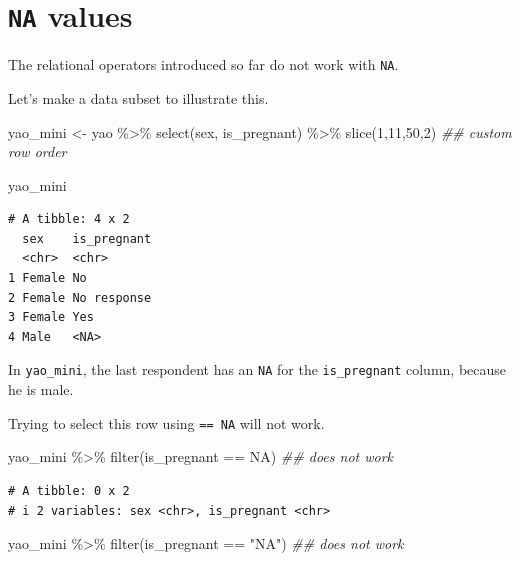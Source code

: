 \documentclass[
  letterpaper,
  DIV=11,
  numbers=noendperiod]{scrreprt}
\newenvironment{Shaded}{\begin{snugshade}}{\end{snugshade}}
\newcommand{\ConstantTok}[1]{\textcolor[rgb]{0.56,0.35,0.01}{#1}}
\newcommand{\DecValTok}[1]{\textcolor[rgb]{0.68,0.00,0.00}{#1}}
\newcommand{\DocumentationTok}[1]{\textcolor[rgb]{0.37,0.37,0.37}{\textit{#1}}}
\newcommand{\FunctionTok}[1]{\textcolor[rgb]{0.28,0.35,0.67}{#1}}
\newcommand{\NormalTok}[1]{\textcolor[rgb]{0.00,0.23,0.31}{#1}}
\newcommand{\OtherTok}[1]{\textcolor[rgb]{0.00,0.23,0.31}{#1}}
\newcommand{\SpecialCharTok}[1]{\textcolor[rgb]{0.37,0.37,0.37}{#1}}
\newcommand{\StringTok}[1]{\textcolor[rgb]{0.13,0.47,0.30}{#1}}
\begin{document}
\hypertarget{na-values}{%
\section{\texorpdfstring{\texttt{NA}
values}{NA values}}\label{na-values}}

The relational operators introduced so far do not work with \texttt{NA}.

Let's make a data subset to illustrate this.

\begin{Shaded}
\begin{Highlighting}[]
\NormalTok{yao\_mini }\OtherTok{\textless{}{-}}\NormalTok{ yao }\SpecialCharTok{\%\textgreater{}\%} 
  \FunctionTok{select}\NormalTok{(sex, is\_pregnant) }\SpecialCharTok{\%\textgreater{}\%} 
  \FunctionTok{slice}\NormalTok{(}\DecValTok{1}\NormalTok{,}\DecValTok{11}\NormalTok{,}\DecValTok{50}\NormalTok{,}\DecValTok{2}\NormalTok{) }\DocumentationTok{\#\# custom row order}

\NormalTok{yao\_mini}
\end{Highlighting}
\end{Shaded}

\begin{verbatim}
# A tibble: 4 x 2
  sex    is_pregnant
  <chr>  <chr>      
1 Female No         
2 Female No response
3 Female Yes        
4 Male   <NA>       
\end{verbatim}

In \texttt{yao\_mini}, the last respondent has an \texttt{NA} for the
\texttt{is\_pregnant} column, because he is male.

Trying to select this row using \texttt{==\ NA} will not work.

\begin{Shaded}
\begin{Highlighting}[]
\NormalTok{yao\_mini }\SpecialCharTok{\%\textgreater{}\%} \FunctionTok{filter}\NormalTok{(is\_pregnant }\SpecialCharTok{==} \ConstantTok{NA}\NormalTok{) }\DocumentationTok{\#\# does not work}
\end{Highlighting}
\end{Shaded}

\begin{verbatim}
# A tibble: 0 x 2
# i 2 variables: sex <chr>, is_pregnant <chr>
\end{verbatim}

\begin{Shaded}
\begin{Highlighting}[]
\NormalTok{yao\_mini }\SpecialCharTok{\%\textgreater{}\%} \FunctionTok{filter}\NormalTok{(is\_pregnant }\SpecialCharTok{==} \StringTok{"NA"}\NormalTok{) }\DocumentationTok{\#\# does not work}
\end{Highlighting}
\end{Shaded}
\end{document}
